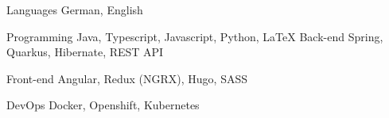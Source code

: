 

\begin{cvskills}

   \cvskill
   {Languages} %
   {German, English} %

    \cvskill
    {Programming} %
    {Java, Typescript, Javascript, Python, LaTeX} %
  \cvskill
    {Back-end} %
    {Spring, Quarkus, Hibernate, REST API} %

  \cvskill
    {Front-end} %
    {Angular, Redux (NGRX), Hugo, SASS} %


\cvskill
{DevOps} %
{Docker, Openshift, Kubernetes} %

\end{cvskills}
